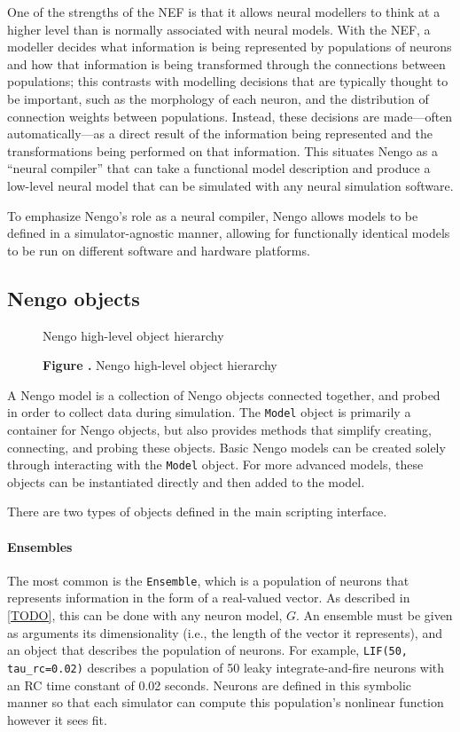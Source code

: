 \documentclass{frontiersSCNS}
\begin{document}
One of the strengths of the NEF
is that it allows neural modellers to think
at a higher level
than is normally associated with neural models.
With the NEF, a modeller decides
what information is being represented
by populations of neurons and how that information
is being transformed through the connections
between populations;
this contrasts with modelling decisions
that are typically thought to be important,
such as the morphology of each neuron,
and the distribution of connection weights
between populations.
Instead, these decisions are made---often
automatically---as a direct result
of the information
being represented and the transformations
being performed on that information.
This situates Nengo as a
``neural compiler'' that can
take a functional model description
and produce a low-level neural model
that can be simulated
with any neural simulation software.

To emphasize Nengo's role as a neural compiler,
Nengo allows models to be defined
in a simulator-agnostic manner,
allowing for functionally identical models to be run
on different software and hardware platforms.

\subsection{Nengo objects} \label{sec:objects}

\begin{figure}
\begin{center}
  Nengo high-level object hierarchy
\end{center}
 \textbf{\label{fig:01} Figure .}{
   Nengo high-level object hierarchy}
\end{figure}

A Nengo model is a collection
of Nengo objects connected together,
and probed in order to collect data
during simulation.
The \texttt{Model} object is primarily a container
for Nengo objects,
but also provides methods
that simplify creating, connecting,
and probing these objects.
Basic Nengo models
can be created solely through interacting
with the \texttt{Model} object.
For more advanced models,
these objects can be instantiated
directly and then added to the model.

There are two types of objects
defined in the main scripting interface.

\paragraph{Ensembles}
The most common is the \texttt{Ensemble},
which is a population of neurons
that represents information
in the form of a real-valued vector.
As described in \eqref{TODO},
this can be done
with any neuron model, $G$.
An ensemble must be given as arguments
its dimensionality
(i.e., the length of the vector it represents),
and an object that describes
the population of neurons.
For example, \texttt{LIF(50, tau\_rc=0.02)}
describes a population
of 50 leaky integrate-and-fire neurons
with an RC time constant of 0.02 seconds.
Neurons are defined in this symbolic manner
so that each simulator can compute
this population's nonlinear function
however it sees fit.
\end{document}
